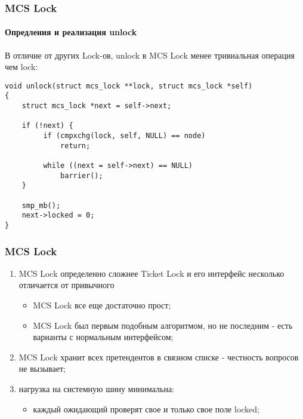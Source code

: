\begin{frame}[fragile]
\frametitle{MCS Lock}
\framesubtitle{Опредления и реализация unlock}
В отличие от других Lock-ов, unlock в MCS Lock менее тривиальная операция чем lock:
\begin{lstlisting}
void unlock(struct mcs_lock **lock, struct mcs_lock *self)
{
    struct mcs_lock *next = self->next;

    if (!next) {
         if (cmpxchg(lock, self, NULL) == node)
             return;

         while ((next = self->next) == NULL)
             barrier();
    }

    smp_mb();
    next->locked = 0;
}
\end{lstlisting}
\end{frame}

\begin{frame}
\frametitle{MCS Lock}

\begin{enumerate}
  \item MCS Lock определенно сложнее Ticket Lock и его интерфейс несколько
        отличается от привычного
        \begin{itemize}
          \item MCS Lock все еще достаточно прост;
          \item MCS Lock был первым подобным алгоритмом, но не последним - есть
                варианты с нормальным интерфейсом;
        \end{itemize}
  \item MCS Lock хранит всех претендентов в связном списке - честность
        вопросов не вызывает;
  \item нагрузка на системную шину минимальна:
        \begin{itemize}
          \item каждый ожидающий проверят свое и только свое поле locked;
        \end{itemize}
\end{enumerate}
\end{frame}
